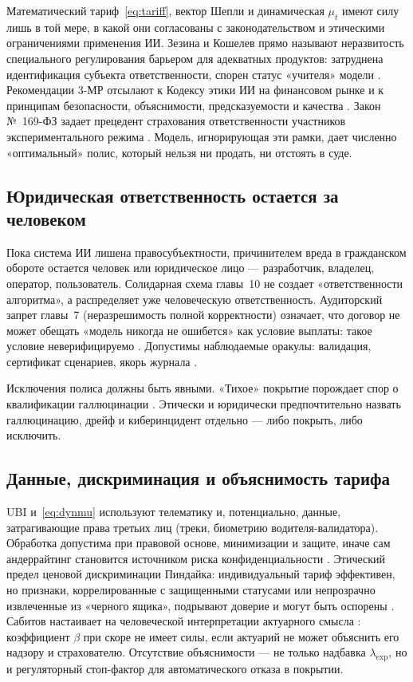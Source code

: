\documentclass[a4paper,14pt]{extarticle}
\begin{document}
Математический тариф~\eqref{eq:tariff}, вектор Шепли и динамическая $\mu_t$ имеют силу лишь в той мере, в какой они согласованы с законодательством и этическими ограничениями применения ИИ. Зезина и Кошелев прямо называют неразвитость специального регулирования барьером для адекватных продуктов: затруднена идентификация субъекта ответственности, спорен статус «учителя» модели \cite{zezina}. Рекомендации 3-МР отсылают к Кодексу этики ИИ на финансовом рынке и к принципам безопасности, объяснимости, предсказуемости и качества \cite{cbr}. Закон №~169-ФЗ задает прецедент страхования ответственности участников экспериментального режима \cite{fz169}. Модель, игнорирующая эти рамки, дает численно «оптимальный» полис, который нельзя ни продать, ни отстоять в суде.

\subsection{Юридическая ответственность остается за человеком}

Пока система ИИ лишена правосубъектности, причинителем вреда в гражданском обороте остается человек или юридическое лицо --- разработчик, владелец, оператор, пользователь. Солидарная схема главы~10 не создает «ответственности алгоритма», а распределяет уже человеческую ответственность. Аудиторский запрет главы~7 (неразрешимость полной корректности) означает, что договор не может обещать «модель никогда не ошибется» как условие выплаты: такое условие неверифицируемо \cite{vereshchagin}. Допустимы наблюдаемые оракулы: валидация, сертификат сценариев, якорь журнала \cite{cbr}.

Исключения полиса должны быть явными. «Тихое» покрытие порождает спор о квалификации галлюцинации \cite{maglinova, zezina}. Этически и юридически предпочтительно назвать галлюцинацию, дрейф и киберинцидент отдельно --- либо покрыть, либо исключить.

\subsection{Данные, дискриминация и объяснимость тарифа}

UBI и~\eqref{eq:dynmu} используют телематику и, потенциально, данные, затрагивающие права третьих лиц (треки, биометрию водителя-валидатора). Обработка допустима при правовой основе, минимизации и защите, иначе сам андеррайтинг становится источником риска конфиденциальности \cite{cbr}. Этический предел ценовой дискриминации Пиндайка: индивидуальный тариф эффективен, но признаки, коррелированные с защищенными статусами или непрозрачно извлеченные из «черного ящика», подрывают доверие и могут быть оспорены \cite{pindyck, maglinova}. Сабитов настаивает на человеческой интерпретации актуарного смысла \cite{sabitov}: коэффициент $\beta$ при скоре не имеет силы, если актуарий не может объяснить его надзору и страхователю. Отсутствие объяснимости --- не только надбавка $\lambda_{\mathrm{exp}}$, но и регуляторный стоп-фактор для автоматического отказа в покрытии.
\end{document}
